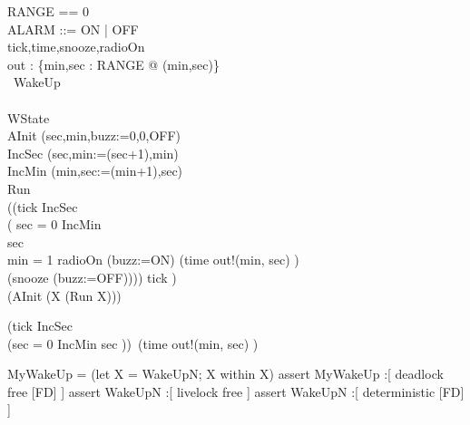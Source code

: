 
\begin{circus}
RANGE == 0 \\
ALARM ::= ON | OFF\\
\circchannel tick,time,snooze,radioOn\\
\circchannel out : \{min,sec : RANGE @ (min,sec)\}\\

\circprocess\ WakeUp \circdef\\
\circbegin\\ 
\circstate WState \\
AInit \circdef (sec,min,buzz:=0,0,OFF)\\
IncSec \circdef (sec,min:=(sec+1),min)\\
IncMin \circdef (min,sec:=(min+1),sec)\\
Run \circdef \\
((tick \then IncSec \circseq \\
		( \lcircguard sec = 0 \rcircguard \circguard IncMin\\
		\extchoice \lcircguard sec  \rcircguard \circguard \Skip\\
		\extchoice \lcircguard min = 1 \rcircguard \circguard radioOn \then (buzz:=ON)
		\extchoice (time \then out!(min, sec) \then \Skip)\\
		\extchoice (snooze \then (buzz:=OFF)))) \circhide \lchanset tick \rchanset)
\\
\circspot (AInit \circseq (\circmu X \circspot (Run \circseq X)))\\
\circend
\end{circus}
(tick \then IncSec \circseq \\
    (\circif  sec = 0 \circthen IncMin
        \circelse sec  \circthen \Skip \circfi ))\ 
    \extchoice (time \then out!(min, sec) \then \Skip)

MyWakeUp = (let X = WakeUpN; X within X)
assert MyWakeUp :[ deadlock free [FD] ]
assert WakeUpN :[ livelock free ]
assert WakeUpN :[ deterministic [FD] ]